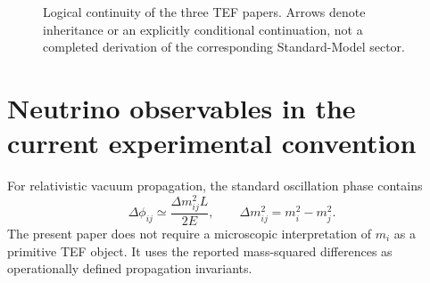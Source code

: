 \documentclass[10pt,twocolumn]{article}
\newcommand{\TEF}{\mathrm{TEF}}
\begin{document}
\begin{figure}[t]
\centering
{}
\caption{Logical continuity of the three TEF papers.  Arrows denote inheritance
or an explicitly conditional continuation, not a completed derivation of the
corresponding Standard-Model sector.}
\label{fig:sequence}
\end{figure}

\section{Neutrino observables in the current experimental convention}
\label{sec:standard}

For relativistic vacuum propagation, the standard oscillation phase contains
\begin{equation}
\Delta\phi_{ij}
\simeq
\frac{\Delta m^2_{ij}L}{2E},
\qquad
\Delta m^2_{ij}=m_i^2-m_j^2.
\label{eq:phase}
\end{equation}
The present paper does not require a microscopic interpretation of $m_i$ as a
primitive TEF object.  It uses the reported mass-squared differences as
operationally defined propagation invariants.
\end{document}
